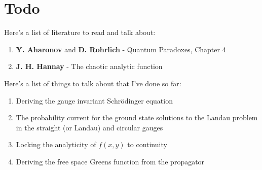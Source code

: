 \section*{Todo}

Here's a list of literature to read and talk about:

\begin{enumerate}
    \item \textbf{Y. Aharonov} and \textbf{D. Rohrlich} - Quantum Paradoxes, Chapter 4
    \item \textbf{J. H. Hannay} - The chaotic analytic function
\end{enumerate}

\noindent Here's a list of things to talk about that I've done so far:

\begin{enumerate}
    \item Deriving the gauge invariant Schr\"odinger equation
    \item The probability current for the ground state solutions to the Landau
        problem in the straight (or Landau) and circular gauges
    \item Locking the analyticity of $f(x,y)$ to continuity
    \item Deriving the free space Greens function from the propagator
\end{enumerate}
